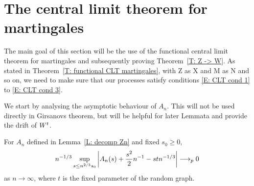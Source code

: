 \section{The central limit theorem for martingales}

The main goal of this section will be the use of the functional central limit theorem for martingales
and subsequently proving Theorem~\ref{T: Z -> W}.
As stated in Theorem~\ref{T: functional CLT martingales}, with Z as X and M as N and so on,
we need to make sure that our processes satisfy conditions \eqref{E: CLT cond 1} to \eqref{E: CLT cond 3}.

We start by analysing the asymptotic behaviour of $A_n$.
This will not be used directly in Girsanovs theorem, 
but will be helpful for later Lemmata and provide the drift of $W^t$.


\begin{lemma} \label{L: limit An}
	For $A_n$ defined in Lemma~\ref{L: decomp Zn} and fixed $s_0 \geq 0$,
	\begin{equation} \label{E: limit An}
	n^{-1 / 3} \sup_{s \leq n^{2 / 3} s_0 } \left| A_n(s) + \frac{s^2}{2}n^{-1} - stn^{-1 / 3} \right| \longrightarrow_p 0
	\end{equation}
	as $n \rightarrow \infty$, where $t$ is the fixed parameter of the random graph.
\end{lemma}

